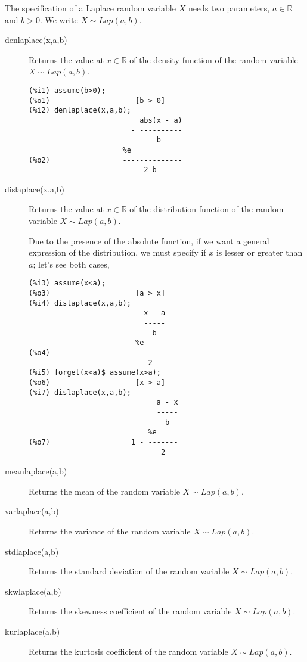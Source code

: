 \documentclass[12pt,a4paper]{article}
\newcommand{\R}{\mathbb{R}}
\begin{document}
The specification of a Laplace random variable $X$ needs two parameters, $a \in \R$ and $b>0$. We write $X \sim Lap(a,b)$.

\begin{description}

\item[denlaplace(x,a,b)] Returns the value at $x \in \R$ of the density function of the random variable $X \sim Lap(a,b)$.

\begin{verbatim}
(%i1) assume(b>0);
(%o1)                    [b > 0]
(%i2) denlaplace(x,a,b);
                          abs(x - a)
                        - ----------
                              b
                      %e
(%o2)                 --------------
                           2 b
\end{verbatim}

\item[dislaplace(x,a,b)] Returns the value at $x \in \R$ of the distribution function of the random variable $X \sim Lap(a,b)$.

Due to the presence of the absolute function, if we want a general expression of the distribution, we must specify if $x$ is lesser or greater than $a$; let's see both cases,
\begin{verbatim}
(%i3) assume(x<a);
(%o3)                    [a > x]
(%i4) dislaplace(x,a,b);
                           x - a
                           -----
                             b
                         %e
(%o4)                    -------
                            2
(%i5) forget(x<a)$ assume(x>a);
(%o6)                    [x > a]
(%i7) dislaplace(x,a,b);
                              a - x
                              -----
                                b
                            %e
(%o7)                   1 - -------
                               2
\end{verbatim}

\item[meanlaplace(a,b)] Returns the mean of the random variable  $X \sim Lap(a,b)$.

\item[varlaplace(a,b)] Returns the variance of the random variable  $X \sim Lap(a,b)$.

\item[stdlaplace(a,b)] Returns the standard deviation of the random variable  $X \sim Lap(a,b)$.

\item[skwlaplace(a,b)] Returns the skewness coefficient of the random variable  $X \sim Lap(a,b)$.

\item[kurlaplace(a,b)] Returns the kurtosis coefficient of the random variable  $X \sim Lap(a,b)$.

\end{description}
\end{document}
